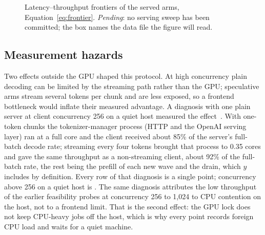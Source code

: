 \begin{figure}[tbp]
\centering
{}
\caption{Latency--throughput frontiers of the served arms, Equation~\eqref{eq:frontier}. \emph{Pending}: no serving sweep has been committed; the box names the data file the figure will read.}
\label{fig:frontier}
\end{figure}

\subsection{Measurement hazards}\label{sec:serving-hazards}
Two effects outside the GPU shaped this protocol. At high concurrency plain decoding can be limited by the streaming path rather than the GPU; speculative arms stream several tokens per chunk and are less exposed, so a frontend bottleneck would inflate their measured advantage. A diagnosis with one plain server at client concurrency 256 on a quiet host measured the effect~. With one-token chunks the tokenizer-manager process (HTTP and the OpenAI serving layer) ran at a full core and the client received about 85\% of the server's full-batch decode rate; streaming every four tokens brought that process to 0.35 cores and gave the same throughput as a non-streaming client, about 92\% of the full-batch rate, the rest being the prefill of each new wave and the drain, which $y$ includes by definition. Every row of that diagnosis is a single point; concurrency above 256 on a quiet host is . The same diagnosis attributes the low throughput of the earlier feasibility probes at concurrency 256 to 1,024 to CPU contention on the host, not to a frontend limit. That is the second effect: the GPU lock does not keep CPU-heavy jobs off the host, which is why every point records foreign CPU load and waits for a quiet machine.
